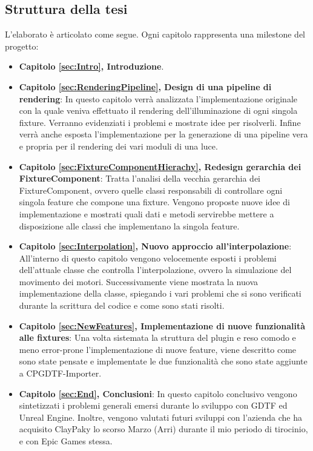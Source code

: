 \documentclass[main.tex]{subfiles}
\begin{document}
\subsection{Struttura della tesi}\label{subsec:1_thesisInfo}
L'elaborato è articolato come segue. Ogni capitolo rappresenta una milestone del progetto:
\begin{itemize}
    \item \textbf{Capitolo \ref{sec:Intro}, Introduzione}. %
    \item \textbf{Capitolo \ref{sec:RenderingPipeline}, Design di una pipeline di rendering}: In questo capitolo verrà analizzata l'implementazione originale con la quale veniva effettuato il rendering dell'illuminazione di ogni singola fixture. Verranno evidenziati i problemi e mostrate idee per risolverli. Infine verrà anche esposta l'implementazione per la generazione di una pipeline vera e propria per il rendering dei vari moduli di una luce. 
    \item \textbf{Capitolo \ref{sec:FixtureComponentHierachy}, Redesign gerarchia dei FixtureComponent}: Tratta l'analisi della vecchia gerarchia dei FixtureComponent, ovvero quelle classi responsabili di controllare ogni singola feature che compone una fixture. Vengono proposte nuove idee di implementazione e mostrati quali dati e metodi servirebbe mettere a disposizione alle classi che implementano la singola feature.
    \item \textbf{Capitolo \ref{sec:Interpolation}, Nuovo approccio all'interpolazione}: All'interno di questo capitolo vengono velocemente esposti i problemi dell'attuale classe che controlla l'interpolazione, ovvero la simulazione del movimento dei motori. Successivamente viene mostrata la nuova implementazione della classe, spiegando i vari problemi che si sono verificati durante la scrittura del codice e come sono stati risolti.
    \item \textbf{Capitolo \ref{sec:NewFeatures}, Implementazione di nuove funzionalità alle fixtures}: Una volta sistemata la struttura del plugin e reso comodo e meno error-prone l'implementazione di nuove feature, viene descritto come sono state pensate e implementate le due funzionalità che sono state aggiunte a CPGDTF-Importer.
    \item \textbf{Capitolo \ref{sec:End}, Conclusioni}: In questo capitolo conclusivo vengono sintetizzati i problemi generali emersi durante lo sviluppo con GDTF ed Unreal Engine. Inoltre, vengono valutati futuri sviluppi con l'azienda che ha acquisito ClayPaky lo scorso Marzo (Arri) durante il mio periodo di tirocinio, e con Epic Games stessa.
\end{itemize}
\end{document}
